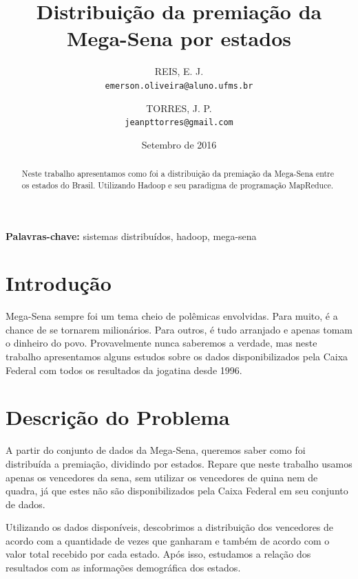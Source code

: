 \documentclass[a4paper,10pt]{article}
\title{Distribuição da premiação da Mega-Sena por estados}
\author{
    REIS, E. J.\\
    \texttt{emerson.oliveira@aluno.ufms.br}
    \and
    TORRES, J. P.\\
    \texttt{jeanpttorres@gmail.com}
}
\date{Setembro de 2016}
\begin{document}
\maketitle

\begin{abstract}
    Neste trabalho apresentamos como foi a distribuição da premiação da Mega-Sena entre os estados do Brasil. Utilizando Hadoop e seu paradigma de programação MapReduce.
\end{abstract}

\textbf{Palavras-chave:} sistemas distribuídos, hadoop, mega-sena


\section{Introdução}
Mega-Sena sempre foi um tema cheio de polêmicas envolvidas. Para muito, é a chance de se tornarem milionários. Para outros, é tudo arranjado e apenas tomam o dinheiro do povo. Provavelmente nunca saberemos a verdade, mas neste trabalho apresentamos alguns estudos sobre os dados disponibilizados pela Caixa Federal\cite{megasena} com todos os resultados da jogatina desde 1996.


\section{Descrição do Problema}
A partir do conjunto de dados da Mega-Sena, queremos saber como foi distribuída a premiação, dividindo por estados. Repare que neste trabalho usamos apenas os vencedores da sena, sem utilizar os vencedores de quina nem de quadra, já que estes não são disponibilizados pela Caixa Federal em seu conjunto de dados.

Utilizando os dados disponíveis, descobrimos a distribuição dos vencedores de acordo com a quantidade de vezes que ganharam e também de acordo com o valor total recebido por cada estado. Após isso, estudamos a relação dos resultados com as informações demográfica dos estados.

\end{document}
